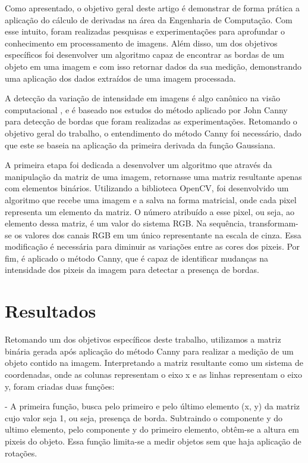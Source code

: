 \documentclass[a4paper,alpha-refs]{RBCA_v1.0}
\begin{document}
Como apresentado, o objetivo geral deste artigo é demonstrar de forma prática a aplicação do cálculo de derivadas na área da Engenharia de Computação. Com esse intuito, foram realizadas pesquisas e experimentações para aprofundar o conhecimento em processamento de imagens. Além disso, um dos objetivos específicos foi desenvolver um algoritmo capaz de encontrar as bordas de um objeto em uma imagem e com isso retornar dados da sua medição, demonstrando uma aplicação dos dados extraídos de uma imagem processada.

A detecção da variação de intensidade em imagens é algo canônico na visão computacional
\citep{canny1983variational}, e é baseado nos estudos do método aplicado por John Canny para detecção de bordas que foram realizadas as experimentações. Retomando o objetivo geral do trabalho, o entendimento do método Canny foi necessário, dado que este se baseia na aplicação da primeira derivada da função Gaussiana.

A primeira etapa foi dedicada a desenvolver um algoritmo que através da manipulação da matriz de uma imagem, retornasse uma matriz resultante apenas com elementos binários. Utilizando a biblioteca OpenCV, foi desenvolvido um algoritmo que recebe uma imagem e a salva na forma matricial, onde cada pixel representa um elemento da matriz. O número atribuído a esse pixel, ou seja, ao elemento dessa matriz, é um valor do sistema RGB. Na sequência, transformam-se os valores dos canais RGB em um único representante na escala de cinza. Essa modificação é necessária para diminuir as variações entre as cores dos pixeis. Por fim, é aplicado o método Canny, que é capaz de identificar mudanças na intensidade dos pixeis da imagem para detectar a presença de bordas.

\section{Resultados}

Retomando um dos objetivos específicos deste trabalho, utilizamos a matriz binária gerada após aplicação do método Canny para realizar a medição de um objeto contido na imagem. Interpretando a matriz resultante como um sistema de coordenadas, onde as colunas representam o eixo x e as linhas representam o eixo y, foram criadas duas funções:

- A primeira função, busca pelo primeiro e pelo último elemento (x, y) da matriz cujo valor seja 1, ou seja, presença de borda. Subtraindo o componente y do ultimo elemento, pelo componente y do primeiro elemento, obtêm-se a altura em pixeis do objeto. Essa função limita-se a medir objetos sem que haja aplicação de rotações.
\end{document}
